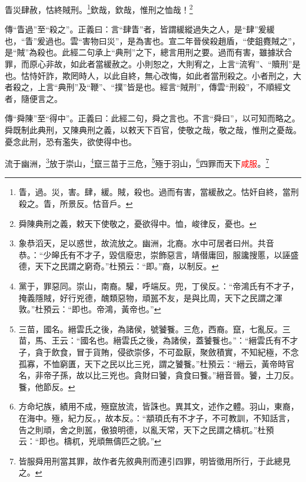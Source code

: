 眚災肆赦，怙終賊刑。\footnote{眚，過。災，害。肆，緩。賊，殺也。過而有害，當緩赦之。怙奸自終，當刑殺之。眚，所景反。怙音戶。}欽哉，欽哉，惟刑之恤哉！\footnote{舜陳典刑之義，敕天下使敬之，憂欲得中。恤，峻律反，憂也。}

{\noindent\zhuan{}\fzbyks 傳“眚過”至“殺之”。正義曰：言“肆眚”者，皆謂緩縱過失之人，是“肆”爰緩也，“眚”爰過也。雲“害物曰災”，是為害也。宣二年晉侯殺趙盾，“使鉏麑賊之”，是“賊”為殺也。此經二句承上“典刑”之下，總言用刑之要。過而有害，雖據狀合罪，而原心非故，如此者當緩赦之。小則恕之，大則宥之，上言“流宥”、“贖刑”是也。怙恃奸詐，欺罔時人，以此自終，無心改悔，如此者當刑殺之。小者刑之，大者殺之，上言“典刑”及“鞭”、“撲”皆是也。經言“賊刑”，傳雲“刑殺”，不順經文者，隨便言之。 \par}

{\noindent\zhuan{}\fzbyks 傳“舜陳”至“得中”。正義曰：此經二句，舜之言也。不言“舜曰”，以可知而略之。舜既制此典刑，又陳典刑之義，以敕天下百官，使敬之哉，敬之哉，惟刑之憂哉。憂念此刑，恐有濫失，欲使得中也。 \par}

流于幽洲，\footnote{象恭滔天，足以惑世，故流放之。幽洲，北裔。水中可居者曰州。共音恭。：“少皞氏有不才子，毀信廢忠，崇飾惡言，靖僣庸回，服讒搜慝，以誣盛德，天下之民謂之窮奇。”杜預云：“即。”裔，以制反。}放于崇山，\footnote{黨于，罪惡同。崇山，南裔。驩，呼端反。兜，丁侯反。：“帝鴻氏有不才子，掩義隱賊，好行兇德，醜類惡物，頑嚚不友，是與比周，天下之民謂之渾敦。”杜預云：“即也。帝鴻，黃帝也。”}竄三苗于三危，\footnote{三苗，國名。縉雲氏之後，為諸侯，號饕餮。三危，西裔。竄，七亂反。三苗，馬、王云：“國名也。縉雲氏之後，為諸侯，蓋饕餮也。”：“縉雲氏有不才子，貪于飲食，冒于貨賄，侵欲崇侈，不可盈厭，聚斂積實，不知紀極，不念孤寡，不恤窮匱，天下之民以比三兇，謂之饕餮。”杜預云：“縉云，黃帝時官名，非帝子孫，故以比三兇也。貪財曰饕，貪食曰餮。”縉音晉。饕，土刀反。餮，他節反。}殛于羽山，\footnote{方命圮族，績用不成，殛竄放流，皆誅也。異其文，述作之體。羽山，東裔，在海中。殛，紀力反。，故本反。：“顓頊氏有不才子，不可教訓，不知話言，告之則頑，舍之則嚚，傲狼明德，以亂天常，天下之民謂之檮杌。”杜預云：“即也。檮杌，兇頑無儔匹之貌。”}四罪而天下\textcolor{red}{咸服}。\footnote{皆服舜用刑當其罪，故作者先敘典刑而連引四罪，明皆徵用所行，于此總見之。}

